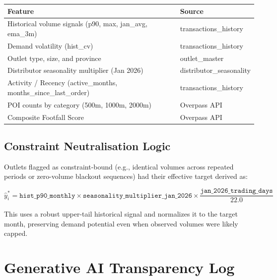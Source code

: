 \documentclass[11pt, a4paper]{article}
\begin{document}
\begin{center}
\small
\begin{tabular}{ll}
  \toprule
  \textbf{Feature} & \textbf{Source} \\
  \midrule
  Historical volume signals (p90, max, jan\_avg, ema\_3m) & transactions\_history \\
  Demand volatility (hist\_cv) & transactions\_history \\
  Outlet type, size, and province & outlet\_master \\
  Distributor seasonality multiplier (Jan 2026) & distributor\_seasonality \\
  Activity / Recency (active\_months, months\_since\_last\_order) & transactions\_history \\
  POI counts by category (500m, 1000m, 2000m) & Overpass API \\
  Composite Footfall Score & Overpass API \\
  \bottomrule
\end{tabular}
\end{center}

\subsection{Constraint Neutralisation Logic}

Outlets flagged as constraint-bound (e.g., identical volumes across repeated
periods or zero-volume blackout sequences) had their effective target derived as:

\begin{equation}
  \hat{y}_i^* = \texttt{hist\_p90\_monthly} \times
                \texttt{seasonality\_multiplier\_jan\_2026} \times
                \frac{\texttt{jan\_2026\_trading\_days}}{22.0}
\end{equation}

This uses a robust upper-tail historical signal and normalizes it to the target
month, preserving demand potential even when observed volumes were likely capped.

\newpage


\section{Generative AI Transparency Log}
\end{document}
